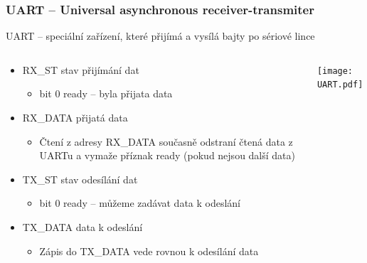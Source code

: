 \documentclass{beamer}
\begin{document}
\begin{frame}
\frametitle{UART -- Universal asynchronous receiver-transmiter}

UART -- speciální zařízení, které přijímá a vysílá bajty po sériové lince

\begin{columns}
\begin{column}{0.55\textwidth}  
\begin{itemize}
\item RX\_ST stav přijímání dat
  \begin{itemize}
  \item bit 0 ready -- byla přijata data
  \end{itemize}
\item RX\_DATA přijatá data
  \begin{itemize}
  \item Čtení z adresy RX\_DATA současně odstraní čtená data z UARTu a vymaže příznak ready (pokud nejsou další data)
  \end{itemize}
\item TX\_ST stav odesílání dat
  \begin{itemize}
  \item bit 0 ready -- můžeme zadávat data k odeslání
  \end{itemize}
\item TX\_DATA data k odeslání
  \begin{itemize}
  \item Zápis do TX\_DATA vede rovnou k odesílání data
  \end{itemize}
\end{itemize}
\end{column}
\begin{column}{0.45\textwidth}
\texttt{[image: UART.pdf]}
\end{column}
\end{columns}

\end{frame}
\end{document}
